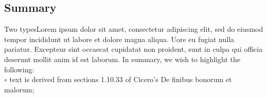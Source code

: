 \documentclass[a0,portrait]{a0poster}
\begin{document}
\begin{minipage}[c]{\linewidth}
\begin{framed}
\begin{multicols}{2}
\section*{Summary}
\color{Black}
Two typesLorem ipsum dolor sit amet, consectetur adipiscing elit, sed do eiusmod tempor incididunt ut labore et dolore magna aliqua. Uore eu fugiat nulla pariatur. Excepteur sint occaecat cupidatat non proident, sunt in culpa qui officia deserunt mollit anim id est laborum. In summary, we wish to highlight the following:\\ 
\hspace{0.1cm}$\circ$ text is derived from sections 1.10.33 of Cicero's De finibus bonorum et malorum;\\

\color{Maroon} \\

\color{Black}

\printbibliography

\end{multicols}
\vspace{0.5cm}
\end{framed}
\end{minipage}
\end{document}
